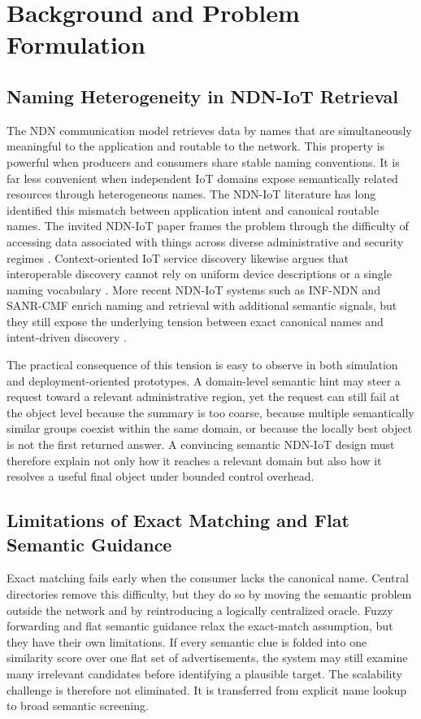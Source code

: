 \documentclass[journal]{IEEEtran}
\begin{document}
\section{Background and Problem Formulation}

\subsection{Naming Heterogeneity in NDN-IoT Retrieval}

The NDN communication model retrieves data by names that are simultaneously meaningful to the application and routable to the network. This property is powerful when producers and consumers share stable naming conventions. It is far less convenient when independent IoT domains expose semantically related resources through heterogeneous names. The NDN-IoT literature has long identified this mismatch between application intent and canonical routable names. The invited NDN-IoT paper frames the problem through the difficulty of accessing data associated with things across diverse administrative and security regimes \cite{ndn_iot_invited}. Context-oriented IoT service discovery likewise argues that interoperable discovery cannot rely on uniform device descriptions or a single naming vocabulary \cite{context_iot}. More recent NDN-IoT systems such as INF-NDN and SANR-CMF enrich naming and retrieval with additional semantic signals, but they still expose the underlying tension between exact canonical names and intent-driven discovery \cite{inf_ndn,sanr}.

The practical consequence of this tension is easy to observe in both simulation and deployment-oriented prototypes. A domain-level semantic hint may steer a request toward a relevant administrative region, yet the request can still fail at the object level because the summary is too coarse, because multiple semantically similar groups coexist within the same domain, or because the locally best object is not the first returned answer. A convincing semantic NDN-IoT design must therefore explain not only how it reaches a relevant domain but also how it resolves a useful final object under bounded control overhead.

\subsection{Limitations of Exact Matching and Flat Semantic Guidance}

Exact matching fails early when the consumer lacks the canonical name. Central directories remove this difficulty, but they do so by moving the semantic problem outside the network and by reintroducing a logically centralized oracle. Fuzzy forwarding and flat semantic guidance relax the exact-match assumption, but they have their own limitations. If every semantic clue is folded into one similarity score over one flat set of advertisements, the system may still examine many irrelevant candidates before identifying a plausible target. The scalability challenge is therefore not eliminated. It is transferred from explicit name lookup to broad semantic screening.
\end{document}
